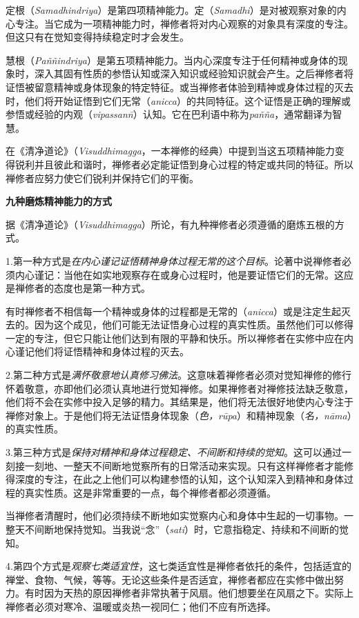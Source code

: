 定根（{\it Samadhindriya}）是第四项精神能力。定（{\it Samadhi}）是对被观察对象的内心专注。当它成为一项精神能力时，禅修者将对内心观察的对象具有深度的专注。但这只有在觉知变得持续稳定时才会发生。

慧根（{\it Pa\~n\~nindriya}）是第五项精神能力。当内心深度专注于任何精神或身体的现象时，深入其固有性质的参悟认知或深入知识或经验知识就会产生。之后禅修者将证悟被留意精神或身体现象的特定特征。或当禅修者体验到精神或身体过程的\1灭去时，他们将开始证悟到它们无常（{\it anicca}）的共同特征。这个证悟是正确的理解或参悟或经验的内观（{\it vipassan\=n}）认知。它在巴利语中称为{\it pa\~n\~na}，通常翻译为智慧。

在《清净道论》（{\it Visuddhimagga}，一本禅修的经典）中提到当这五项精神能力变得锐利并且彼此和谐时，禅修者必定能证悟到身心过程的特定或共同的特征。所以禅修者应努力使它们锐利并保持它们的平衡。

{\medbreak\bf 九种磨炼精神能力的方式\smallbreak}

据《清净道论》（{\it Visuddhimagga}）所论，有九种禅修者必须遵循的磨炼五根的方式。

1.第一种方式是{\it 在内心谨记证悟精神身体过程无常的这个目标}。论著中说禅修者必须内心谨记：当他在如实地观察存在或身心过程时，他是要证悟它们的无常。这应是禅修者的态度也是第一种方式。

有时禅修者不相信每一个精神或身体的过程都是无常的（{\it anicca}）或是注定生起灭去的。因为这个成见，他们可能无法证悟身心过程的真实性质。虽然他们可以修得一定的专注，但它只能让他们达到有限的平静和快乐。所以\1禅修者在实修中应在内心谨记他们将证悟精神和身体过程的灭去。

2.第二种方式是{\it 满怀敬意地认真修习佛法}。这意味着禅修者必须对觉知禅修的修行怀着敬意，亦即他们必须认真地进行觉知禅修。如果禅修者对禅修技法缺乏敬意，他们将不会在实修中投入足够的精力。其结果是，他们将无法很好地使内心专注于禅修对象上。于是他们将无法证悟身体现象（{\it 色，r\=upa}）和精神现象（{\it 名，n\=ama}）的真实性质。

3.第三种方式是{\it 保持对精神和身体过程稳定、不间断和持续的觉知}。这可以通过一刻接一刻地、一整天不间断地觉察所有的日常活动来实现。只有这样禅修者才能修得深度的专注，在此之上他们可以构建参悟的认知，这个认知深入到精神和身体过程的真实性质。这是非常重要的一点，每个禅修者都必须遵循。

当禅修者清醒时，他们必须持续不断地如实觉察内心和身体中生起的一切事物。一整天不间断地保持觉知。当我说“念”（{\it sati}）时，它意指稳定、持续和不间断的觉知。

4.第四个方式是{\it 观察七类适宜性}，这七类适宜性是禅修者依托的条件，包括适宜的禅堂、食物、气候，等等。无论这些条件是否适宜，禅修者都应在实修中做出努力。有时因为天热的原因禅修者非常执著于风扇。他们想要坐在风扇之下。实际上禅修者必须对寒冷、温暖或炎热一视同仁；他们不应有所选择。

